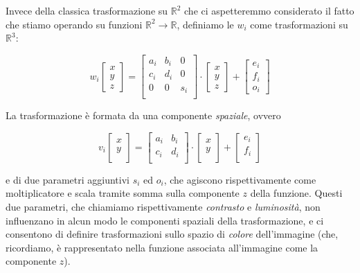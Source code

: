 \documentclass[11pt,a4paper,appendixprefix=true,numbers=noenddot]{scrreprt}
\begin{document}
Invece della classica trasformazione su $\mathbb{R}^2$ che ci aspetteremmo considerato il fatto che stiamo operando su funzioni $\mathbb{R}^2 \rightarrow \mathbb{R}$, definiamo le $w_i$ come trasformazioni su $\mathbb{R}^3$:

\[
w_i \begin{bmatrix} 
x \\
y \\
z
\end{bmatrix} = \begin{bmatrix}
a_i & b_i & 0 \\
c_i & d_i & 0 \\
0 & 0 & s_i \\
\end{bmatrix} \cdot \begin{bmatrix} 
x \\
y \\
z
\end{bmatrix} + \begin{bmatrix} 
e_i \\
f_i \\
o_i
\end{bmatrix}
\]

La trasformazione è formata da una componente \emph{spaziale}, ovvero

\[
v_i \begin{bmatrix} 
x \\
y \\
\end{bmatrix} = \begin{bmatrix}
a_i & b_i \\
c_i & d_i \\
\end{bmatrix} \cdot \begin{bmatrix} 
x \\
y \\
\end{bmatrix} + \begin{bmatrix} 
e_i \\
f_i \\
\end{bmatrix}
\]

e di due parametri aggiuntivi $s_i$ ed $o_i$, che agiscono rispettivamente come moltiplicatore e scala tramite somma sulla componente $z$ della funzione. Questi due parametri, che chiamiamo rispettivamente \emph{contrasto} e \emph{luminosità}, non influenzano in alcun modo le componenti spaziali della trasformazione, e ci consentono di definire trasformazioni sullo spazio di \emph{colore} dell'immagine (che, ricordiamo, è rappresentato nella funzione associata all'immagine come la componente $z$). 
\end{document}
